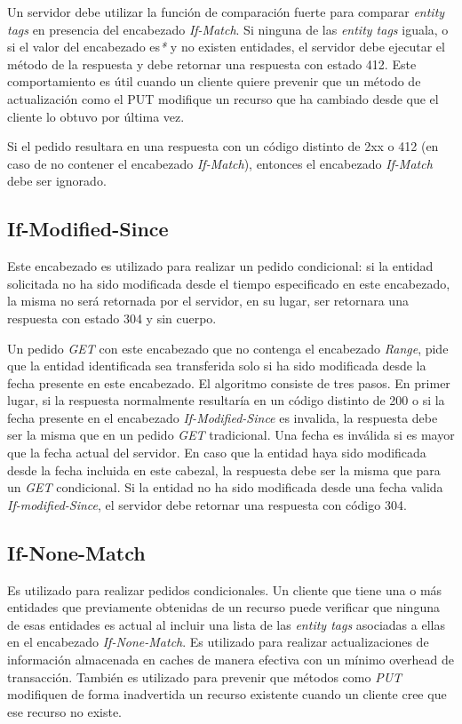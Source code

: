 \documentclass[a4paper,12pt]{report}
\begin{document}
Un servidor debe utilizar la función de comparación fuerte para comparar \emph{entity tags} en presencia del encabezado \emph{If-Match}. Si ninguna de las \emph{entity tags}
iguala, o si el valor del encabezado es\emph{*} y no existen entidades, el servidor debe ejecutar el método de la respuesta y debe retornar una respuesta con estado 412. Este
comportamiento es útil cuando un cliente quiere prevenir que un método de actualización como el PUT modifique un recurso que ha cambiado desde que el cliente lo obtuvo por última
vez.

Si el pedido resultara en una respuesta con un código distinto de 2xx o 412 (en caso de no contener el encabezado \emph{If-Match}), entonces el encabezado \emph{If-Match} debe
ser ignorado.

\subsection{If-Modified-Since}
Este encabezado es utilizado para realizar un pedido condicional: si la entidad solicitada no ha sido modificada desde el tiempo especificado en este encabezado, la
misma no será retornada por el servidor, en su lugar, ser retornara una respuesta con estado 304 y sin cuerpo.

Un pedido \emph{GET} con este encabezado que no contenga el encabezado \emph{Range}, pide que la entidad identificada sea transferida solo si ha sido modificada desde la fecha
presente en este encabezado. El algoritmo consiste de tres pasos. En primer lugar, si la respuesta normalmente resultaría en un código distinto de 200 o si la fecha presente
en el encabezado \emph{If-Modified-Since} es invalida, la respuesta debe ser la misma que en un pedido \emph{GET} tradicional. Una fecha es inválida si es mayor que la fecha
actual del servidor. En caso que la entidad haya sido modificada desde la fecha incluida en este cabezal, la respuesta debe ser la misma que para un \emph{GET} condicional.
Si la entidad no ha sido modificada desde una fecha valida \emph{If-modified-Since}, el servidor debe retornar una respuesta con código 304.

\subsection{If-None-Match}
Es utilizado para realizar pedidos condicionales.  Un cliente que tiene una o más entidades que previamente obtenidas de un recurso puede
verificar que ninguna de esas entidades es actual al incluir una lista de las \emph{entity tags} asociadas a ellas en el encabezado \emph{If-None-Match}. Es utilizado para realizar
actualizaciones de información almacenada en caches de manera efectiva con un mínimo overhead de transacción. También es utilizado para prevenir que métodos como \emph{PUT}
modifiquen de forma inadvertida un recurso existente cuando un cliente cree que ese recurso no existe.
\end{document}
